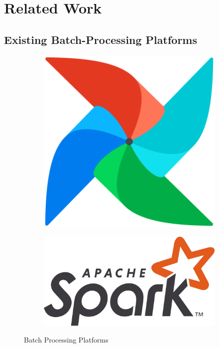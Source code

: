 \chapter{Related Work}
\label{Chapter-Related-Work}

\section{Existing Batch-Processing Platforms}

\begin{figure}[h!]
  \centering
  \begin{subfigure}[b]{0.2\textwidth}
    \includegraphics[width=\textwidth]{Images/airflow.png}
    \label{fig:airflow}
  \end{subfigure}
  \begin{subfigure}[b]{0.3\textwidth}
    \includegraphics[width=\textwidth]{Images/Apache_Spark_logo.svg.png}
    \label{fig:spark}
  \end{subfigure}
  \hfill
  \caption{Batch Processing Platforms}
  \label{fig:authservices}
\end{figure}

